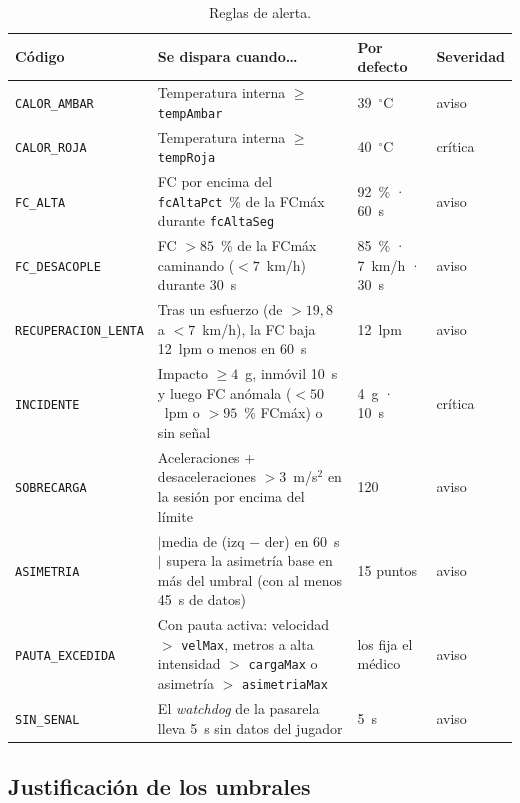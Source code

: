 \documentclass[runningheads]{llncs}
\begin{document}
\begin{table}[!htbp]
\centering
\caption{Reglas de alerta.}\label{tab:reglas}
\scriptsize
\begin{tabularx}{\textwidth}{p{2.8cm}Lp{2.1cm}p{1.1cm}}
\toprule
\textbf{Código} & \textbf{Se dispara cuando\ldots} & \textbf{Por defecto} & \textbf{Severidad} \\
\midrule
\texttt{CALOR\_AMBAR} & Temperatura interna $\geq$ \texttt{tempAmbar} & 39~$^\circ$C & aviso \\
\texttt{CALOR\_ROJA} & Temperatura interna $\geq$ \texttt{tempRoja} & 40~$^\circ$C & crítica \\
\texttt{FC\_ALTA} & FC por encima del \texttt{fcAltaPct}~\% de la FCmáx durante \texttt{fcAltaSeg} & 92~\% · 60~s & aviso \\
\texttt{FC\_DESACOPLE} & FC $>85$~\% de la FCmáx caminando ($<7$~km/h) durante 30~s & 85~\% · 7~km/h · 30~s & aviso \\
\texttt{RECUPERACION\_LENTA} & Tras un esfuerzo (de $>19{,}8$ a $<7$~km/h), la FC baja 12~lpm o menos en 60~s & 12~lpm & aviso \\
\texttt{INCIDENTE} & Impacto $\geq4$~g, inmóvil 10~s y luego FC anómala ($<50$~lpm o $>95$~\% FCmáx) o sin señal & 4~g · 10~s & crítica \\
\texttt{SOBRECARGA} & Aceleraciones + desaceleraciones $>3$~m/s$^2$ en la sesión por encima del límite & 120 & aviso \\
\texttt{ASIMETRIA} & $|$media de (izq $-$ der) en 60~s$|$ supera la asimetría base en más del umbral (con al menos 45~s de datos) & 15 puntos & aviso \\
\texttt{PAUTA\_EXCEDIDA} & Con pauta activa: velocidad $>$ \texttt{velMax}, metros a alta intensidad $>$ \texttt{cargaMax} o asimetría $>$ \texttt{asimetriaMax} & los fija el médico & aviso \\
\texttt{SIN\_SENAL} & El \emph{watchdog} de la pasarela lleva 5~s sin datos del jugador & 5~s & aviso \\
\bottomrule
\end{tabularx}
\end{table}

\subsection{Justificación de los umbrales}
\end{document}
